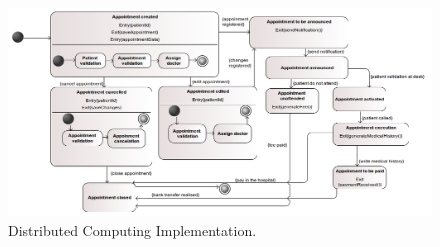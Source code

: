 \documentclass{article}
\begin{document}
            \begin{figure}[H]
                \centering 
                \includegraphics[width=1\linewidth]{./img/state.png}
                \caption{Distributed Computing Implementation.}
                \label{fig:architecture}
            \end{figure}
    
        
    
\end{document}
